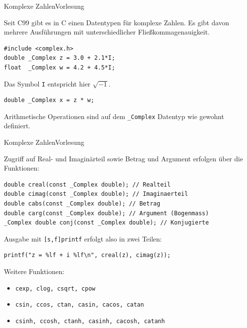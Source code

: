 \documentclass[xcolor=dvipsnames]{beamer}
\newcounter{lecturecounter}
\begin{document}
\begin{frame}[fragile]{Komplexe Zahlen}{Vorlesung }
\begin{block}{}
  Seit C99 gibt es in C einen Datentypen für komplexe Zahlen. Es gibt davon mehrere Ausführungen mit unterschiedlicher Fließkommagenauigkeit.
\end{block}
\begin{lstlisting}
#include <complex.h>
double _Complex z = 3.0 + 2.1*I;
float  _Complex w = 4.2 + 4.5*I;
\end{lstlisting}
\begin{block}{}
Das Symbol \texttt{I} entspricht hier $\sqrt{-1}$.  
\end{block}
\begin{lstlisting}
double _Complex x = z * w;  
\end{lstlisting}
\begin{block}{}
  Arithmetische Operationen sind auf dem \texttt{\_Complex} Datentyp wie gewohnt definiert.
\end{block}
\end{frame}

\begin{frame}[fragile]{Komplexe Zahlen}{Vorlesung }
\begin{block}{}
  Zugriff auf Real- und Imaginärteil sowie Betrag und Argument erfolgen über die Funktionen:
\end{block}
\begin{lstlisting}
double creal(const _Complex double); // Realteil
double cimag(const _Complex double); // Imaginaerteil
double cabs(const _Complex double); // Betrag
double carg(const _Complex double); // Argument (Bogenmass)
_Complex double conj(const _Complex double); // Konjugierte
\end{lstlisting}
\begin{block}{}
Ausgabe mit \texttt{[s,f]printf} erfolgt also in zwei Teilen:
\end{block}
\begin{lstlisting}
printf("z = %lf + i %lf\n", creal(z), cimag(z));
\end{lstlisting}
\begin{block}{}
  Weitere Funktionen: 
  \begin{itemize}
    \item{\verb|cexp, clog, csqrt, cpow|}
    \item{\verb|csin, ccos, ctan, casin, cacos, catan|}
    \item{\verb|csinh, ccosh, ctanh, casinh, cacosh, catanh|}
  \end{itemize}
\end{block}
\end{frame}
\end{document}
